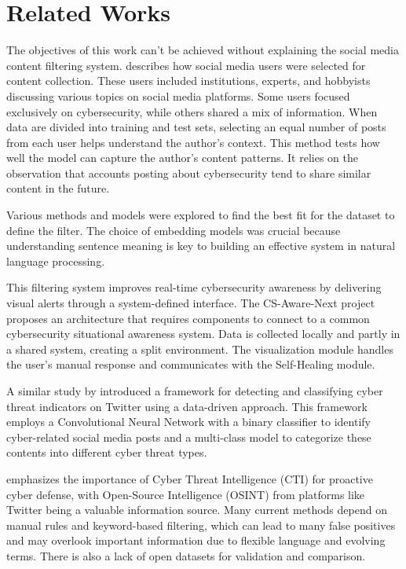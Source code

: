 \section{Related Works}\label{sec:related-works}
The objectives of this work can't be achieved without explaining the social media content filtering system. \cite{cotov2023} describes how social media users were selected for content collection. These users included institutions, experts, and hobbyists discussing various topics on social media platforms. Some users focused exclusively on cybersecurity, while others shared a mix of information. When data are divided into training and test sets, selecting an equal number of posts from each user helps understand the author's context. This method tests how well the model can capture the author's content patterns. It relies on the observation that accounts posting about cybersecurity tend to share similar content in the future.

Various methods and models were explored to find the best fit for the dataset to define the filter. The choice of embedding models was crucial because understanding sentence meaning is key to building an effective system in natural language processing.

This filtering system improves real-time cybersecurity awareness by delivering visual alerts through a system-defined interface. The CS-Aware-Next project proposes an architecture that requires components to connect to a common cybersecurity situational awareness system. Data is collected locally and partly in a shared system, creating a split environment. The visualization module handles the user's manual response and communicates with the Self-Healing module.

A similar study by \cite{behzadan2018} introduced a framework for detecting and classifying cyber threat indicators on Twitter using a data-driven approach. This framework employs a Convolutional Neural Network with a binary classifier to identify cyber-related social media posts and a multi-class model to categorize these contents into different cyber threat types.

\cite{behzadan2018} emphasizes the importance of Cyber Threat Intelligence (CTI) for proactive cyber defense, with Open-Source Intelligence (OSINT) from platforms like Twitter being a valuable information source. Many current methods depend on manual rules and keyword-based filtering, which can lead to many false positives and may overlook important information due to flexible language and evolving terms. There is also a lack of open datasets for validation and comparison.

